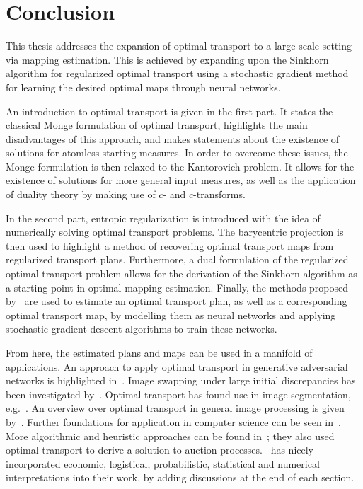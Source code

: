\chapter*{Conclusion}

This thesis addresses the expansion of optimal transport to a large-scale setting via mapping estimation. This is achieved by expanding upon the Sinkhorn algorithm for regularized optimal transport using a stochastic gradient method for learning the desired optimal maps through neural networks.

An introduction to optimal transport is given in the first part. It states the classical Monge formulation of optimal transport, highlights the main disadvantages of this approach, and makes statements about the existence of solutions for atomless starting measures. In order to overcome these issues, the Monge formulation is then relaxed to the Kantorovich problem. It allows for the existence of solutions for more general input measures, as well as the application of duality theory by making use of $c$- and $\bar{c}$-transforms.

In the second part, entropic regularization is introduced with the idea of numerically solving optimal transport problems. The barycentric projection is then used to highlight a method of recovering optimal transport maps from regularized transport plans. Furthermore, a dual formulation of the regularized optimal transport problem allows for the derivation of the Sinkhorn algorithm as a starting point in optimal mapping estimation. Finally, the methods proposed by\ \cite{Seg2018} are used to estimate an optimal transport plan, as well as a corresponding optimal transport map, by modelling them as neural networks and applying stochastic gradient descent algorithms to train these networks.

From here, the estimated plans and maps can be used in a manifold of applications. An approach to apply optimal transport in generative adversarial networks is highlighted in\ \cite{Sal2018}. Image swapping under large initial discrepancies has been investigated by\ \cite{Zhu2020}. Optimal transport has found use in image segmentation, e.g.\ \cite{Rabin2015}. An overview over optimal transport in general image processing is given by\ \cite{Papa2015}. Further foundations for application in computer science can be seen in\ \cite{Levy2017}. More algorithmic and heuristic approaches can be found in~\cite{Pey2019}; they also used optimal transport to derive a solution to auction processes.\ \cite{San2015} has nicely incorporated economic, logistical, probabilistic, statistical and numerical interpretations into their work, by adding discussions at the end of each section.

